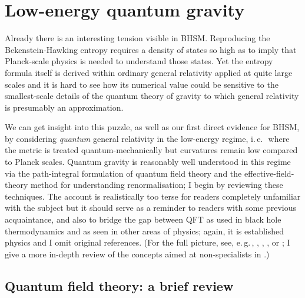 \documentclass[12pt]{article}
\newcommand{\ie}{\mbox{i.\,e.\,\ }}
\newcommand{\egc}{\mbox{e.\,g.\,}}
\begin{document}
\section{Low-energy quantum gravity}\label{lowenergy}

Already there is an interesting tension visible in BHSM. Reproducing the Bekenstein-Hawking entropy requires a density of states so high as to imply that Planck-scale physics is needed to understand those states. Yet the entropy formula itself is derived within ordinary general relativity applied at quite large scales and it is hard to see how its numerical value could be sensitive to the smallest-scale details of the quantum theory of gravity to which general relativity is presumably an approximation.

We can get insight into this puzzle, as well as our first direct evidence for BHSM, by considering \emph{quantum} general relativity in the low-energy regime, \ie where the metric is treated quantum-mechanically but curvatures remain low compared to Planck scales. Quantum gravity is reasonably well understood in this regime via the path-integral formulation of quantum field theory and the effective-field-theory method for understanding renormalisation; I begin by reviewing these techniques. The account is realistically too terse for readers completely unfamiliar with the subject but it should serve as a reminder to readers with some previous acquaintance, and also to bridge the gap between QFT as used in black hole thermodynamics and as seen in other areas of physics; again, it is established physics and I omit original references. (For the full picture, see, \egc, , , , or ; I give a more in-depth review of the concepts aimed at non-specialists in .)

\subsection{Quantum field theory: a brief review}\label{qftintro}
\end{document}
